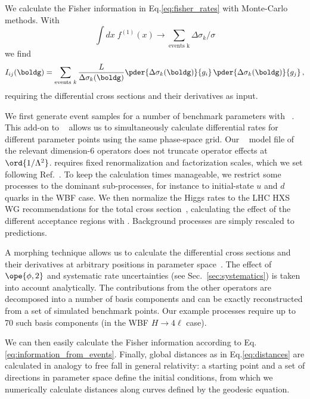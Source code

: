 We calculate the Fisher information in Eq.\;\eqref{eq:fisher_rates}
with Monte-Carlo methods. With
%
\begin{equation}
  \int \! d x \; f^{(1)} (x) \to \sum_{\text{events k}} \Delta \sigma_k / \sigma
\end{equation}
%
we find
%
\begin{equation}
  I_{ij} (\boldg)
  = \sum_{\text{events } k} \frac{L}{\Delta \sigma_k (\boldg)}
  \pder { \Delta \sigma_k (\boldg)} {g_i} \,
  \pder { \Delta \sigma_k (\boldg)} {g_j} \,,
  \label{eq:information_from_events}
\end{equation}
%
requiring the differential cross sections and their derivatives as
input.

We first generate event samples for a number of benchmark parameters
with ~\cite{madmax2}. This add-on to
~\cite{madgraph} allows us to simultaneously
calculate differential rates for different parameter points using the
same phase-space grid. Our ~\cite{feynrules} model
file of the relevant dimension-6 operators does not truncate operator
effects at $\ord{1/\Lambda^2}$.  requires fixed
renormalization and factorization scales, which we set following
Ref.~\cite{yr4}. To keep the calculation times manageable, we restrict
some processes to the dominant sub-processes, for instance to
initial-state $u$ and $d$ quarks in the WBF case.  We then normalize
the Higgs rates to the LHC HXS WG recommendations for the total cross
section~\cite{yr4}, calculating the effect of the different acceptance
regions with . Background processes are simply
rescaled to  predictions.

A morphing technique allows us to calculate the differential cross
sections and their derivatives at arbitrary positions in parameter
space~\cite{morphing}. The effect of $\ope{\phi,2}$ and systematic
rate uncertainties (see Sec.~\ref{sec:systematics}) is taken into
account analytically. The contributions from the other operators are
decomposed into a number of basis components and can be exactly
reconstructed from a set of simulated benchmark points. Our example
processes require up to 70 such basis components (in the WBF
$H \to 4 \ell$ case).

We can then easily calculate the Fisher information according to
Eq.\;\eqref{eq:information_from_events}. Finally, global distances as in
Eq.\;\eqref{eq:distances} are calculated in analogy to free fall in
general relativity: a starting point and a set of directions in
parameter space define the initial conditions, from which we
numerically calculate distances along curves defined by the geodesic
equation.





